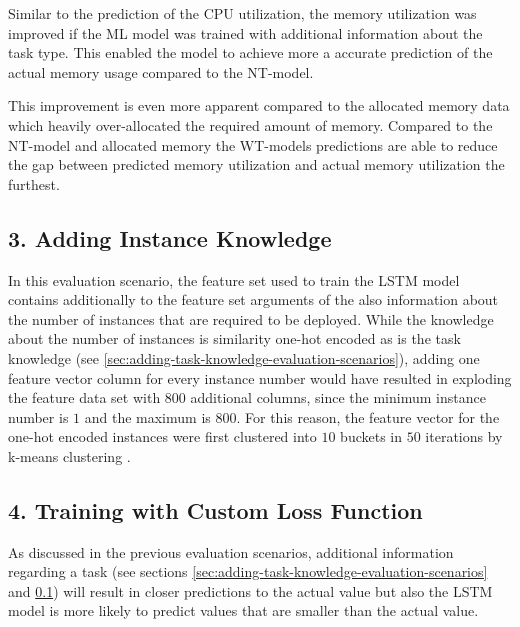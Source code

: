       Similar to the prediction of the CPU utilization, the memory utilization was improved if the ML model was trained with additional information about the task type. This enabled the model to achieve more a accurate prediction of the actual memory usage compared to the NT-model.

      This improvement is even more apparent compared to the allocated memory data which heavily over-allocated the required amount of memory. Compared to the NT-model and allocated memory the WT-models predictions are able to reduce the gap between predicted memory utilization and actual memory utilization the furthest.

  \subsection{3. Adding Instance Knowledge}
  \label{sec:adding-instance-knowledge-evaluation-scenarios}

    In this evaluation scenario, the feature set used to train the LSTM model contains additionally to the feature set arguments of the  also information about the number of instances that are required to be deployed. While the knowledge about the number of instances is similarity one-hot encoded as is the task knowledge (see \ref{sec:adding-task-knowledge-evaluation-scenarios}), adding one feature vector column for every instance number would have resulted in exploding the feature data set with 800 additional columns, since the minimum instance number is $1$ and the maximum is $800$.
    For this reason, the feature vector for the one-hot encoded instances were first clustered into $10$ buckets in $50$ iterations by k-means clustering \cite{hartiganAlgorithm136Kmeans1979}.

  \subsection{4. Training with Custom Loss Function}
  \label{sec:training-with-custom-loss-function-evaluation-scenarios}

      As discussed in the previous evaluation scenarios, 
      additional information regarding a task (see sections \ref{sec:adding-task-knowledge-evaluation-scenarios} and \ref{sec:adding-instance-knowledge-evaluation-scenarios}) will result in closer predictions to the actual value but also the LSTM model is more likely to predict values that are smaller than the actual value.
      
